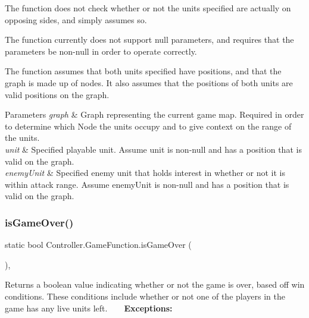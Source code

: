 \begin{DoxyItemize}
\item The function does not check whether or not the units specified are actually on opposing sides, and simply assumes so.
\item The function currently does not support null parameters, and requires that the parameters be non-\/null in order to operate correctly.
\item The function assumes that both units specified have positions, and that the graph is made up of nodes. It also assumes that the positions of both units are valid positions on the graph. 
\begin{DoxyParams}{Parameters}
{\em graph} & Graph representing the current game map. Required in order to determine which Node the units occupy and to give context on the range of the units. \\
\hline
{\em unit} & Specified playable unit. Assume unit is non-\/null and has a position that is valid on the graph. \\
\hline
{\em enemy\+Unit} & Specified enemy unit that holds interest in whether or not it is within attack range. Assume enemy\+Unit is non-\/null and has a position that is valid on the graph. \\
\hline
\end{DoxyParams}

\end{DoxyItemize}\hypertarget{class_controller_1_1_game_function_a0696007a9d80f8e6ae9b28b3a3ba4b43}{}\label{class_controller_1_1_game_function_a0696007a9d80f8e6ae9b28b3a3ba4b43} 
\subsubsection{\texorpdfstring{is\+Game\+Over()}{isGameOver()}}
{\footnotesize\ttfamily static bool Controller.\+Game\+Function.\+is\+Game\+Over (\begin{DoxyParamCaption}{ }\end{DoxyParamCaption})\hspace{0.3cm}{\ttfamily [inline]}, {\ttfamily [static]}}

Returns a boolean value indicating whether or not the game is over, based off win conditions. These conditions include whether or not one of the players in the game has any live units left. ~\newline
~\newline
 {\bfseries Exceptions\+:} ~\newline

